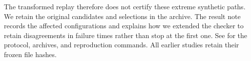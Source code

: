 The transformed replay therefore does not certify these extreme synthetic
paths. We retain the original candidates and selections in the archive. The
result note records the affected configurations and explains how we extended the
checker to retain disagreements in failure times rather than stop at the first
one. See  for the protocol,
archives, and reproduction commands. All earlier studies retain their frozen
file hashes.
